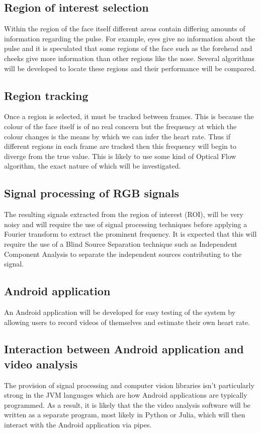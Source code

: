 \subsection*{Region of interest selection}
Within the region of the face itself different areas contain differing amounts of information regarding the pulse. For example, eyes give no information about the pulse and it is speculated that some regions of the face such as the forehead and cheeks give more information than other regions like the nose. Several algorithms will be developed to locate these regions and their performance will be compared.

\subsection*{Region tracking}
Once a region is selected, it must be tracked between frames. This is because the colour of the face itself is of no real concern but the frequency at which the colour changes is the means by which we can infer the heart rate. Thus if different regions in each frame are tracked then this frequency will begin to diverge from the true value. This is likely to use some kind of Optical Flow algorithm, the exact nature of which will be investigated.

\subsection*{Signal processing of RGB signals}
The resulting signals extracted from the region of interest (ROI), will be very noisy and will require the use of signal processing techniques before applying a Fourier transform to extract the prominent frequency. It is expected that this will require the use of a Blind Source Separation technique such as Independent Component Analysis to separate the independent sources contributing to the signal.

\subsection*{Android application}
An Android application will be developed for easy testing of the system by allowing users to record videos of themselves and estimate their own heart rate.

\subsection*{Interaction between Android application and video analysis}
The provision of signal processing and computer vision libraries isn’t particularly strong in the JVM languages which are how Android applications are typically programmed. As a result, it is likely that the the video analysis software will be written as a separate program, most likely in Python or Julia, which will then interact with the Android application via pipes. 

